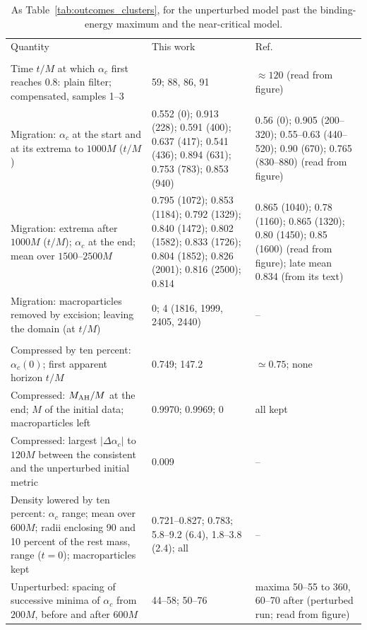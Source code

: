 \begin{table}
\caption{As Table~\ref{tab:outcomes_clusters}, for the unperturbed model past the binding-energy maximum and the near-critical model.}
\label{tab:outcomes_migration}
\footnotesize
\setlength{\tabcolsep}{3pt}
\begin{ruledtabular}
\begin{tabular}{p{}p{}p{}}
Quantity & This work & Ref.~\cite{Wu:2026nrpic} \tabularnewline
\colrule
\multicolumn{3}{l}{\textit{Unperturbed $y_c=0.5$}} \tabularnewline
\raggedright Time $t/M$ at which $\alpha_c$ first reaches 0.8: plain filter; compensated, samples 1--3 & \raggedright 59; 88, 86, 91 & \raggedright $\approx120$ (read from figure) \tabularnewline
\raggedright Migration: $\alpha_c$ at the start and at its extrema to $1000M$ ($t/M$) & \raggedright 0.552 (0); 0.913 (228); 0.591 (400); 0.637 (417); 0.541 (436); 0.894 (631); 0.753 (783); 0.853 (940) & \raggedright 0.56 (0); 0.905 (200--320); 0.55--0.63 (440--520); 0.90 (670); 0.765 (830--880) (read from figure) \tabularnewline
\raggedright Migration: extrema after $1000M$ ($t/M$); $\alpha_c$ at the end; mean over $1500$--$2500M$ & \raggedright 0.795 (1072); 0.853 (1184); 0.792 (1329); 0.840 (1472); 0.802 (1582); 0.833 (1726); 0.804 (1852); 0.826 (2001); 0.816 (2500); 0.814 & \raggedright 0.865 (1040); 0.78 (1160); 0.865 (1320); 0.80 (1450); 0.85 (1600) (read from figure); late mean 0.834 (from its text) \tabularnewline
\raggedright Migration: macroparticles removed by excision; leaving the domain (at $t/M$) & \raggedright 0; 4 (1816, 1999, 2405, 2440) & \raggedright -- \tabularnewline
\colrule
\multicolumn{3}{l}{\textit{Near-critical $y_c=0.756$}} \tabularnewline
\raggedright Compressed by ten percent: $\alpha_c(0)$; first apparent horizon $t/M$ & \raggedright 0.749; 147.2 & \raggedright $\simeq0.75$; none \tabularnewline
\raggedright Compressed: $M_{\rm AH}/M$ at the end; $M$ of the initial data; macroparticles left & \raggedright 0.9970; 0.9969; 0 & \raggedright all kept \tabularnewline
\raggedright Compressed: largest $|\Delta\alpha_c|$ to $120M$ between the consistent and the unperturbed initial metric & \raggedright 0.009 & \raggedright -- \tabularnewline
\raggedright Density lowered by ten percent: $\alpha_c$ range; mean over $600M$; radii enclosing 90 and 10 percent of the rest mass, range ($t=0$); macroparticles kept & \raggedright 0.721--0.827; 0.783; 5.8--9.2 (6.4), 1.8--3.8 (2.4); all & \raggedright -- \tabularnewline
\raggedright Unperturbed: spacing of successive minima of $\alpha_c$ from $200M$, before and after $600M$ & \raggedright 44--58; 50--76 & \raggedright maxima 50--55 to 360, 60--70 after (perturbed run; read from figure) \tabularnewline

\end{tabular}
\end{ruledtabular}
\end{table}
